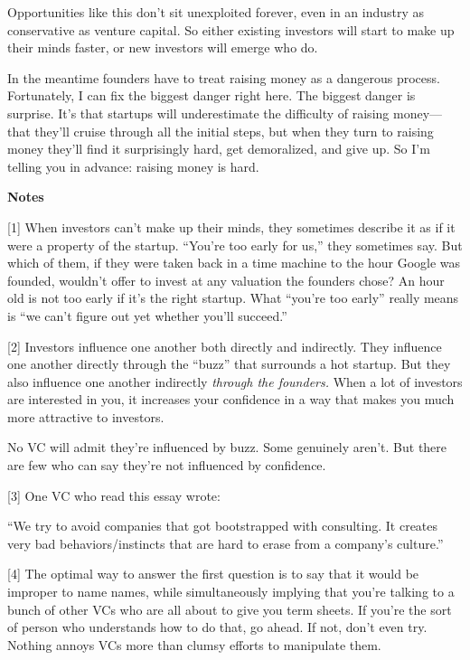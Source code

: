 Opportunities like this don't sit unexploited forever, even in an
industry as conservative as venture capital. So either existing
investors will start to make up their minds faster, or new investors
will emerge who do.

In the meantime founders have to treat raising money as a dangerous
process. Fortunately, I can fix the biggest danger right here. The
biggest danger is surprise. It's that startups will underestimate the
difficulty of raising money---that they'll cruise through all the
initial steps, but when they turn to raising money they'll find it
surprisingly hard, get demoralized, and give up. So I'm telling you in
advance: raising money is hard.

\textbf{Notes}

{[}1{]} When investors can't make up their minds, they sometimes
describe it as if it were a property of the startup. ``You're too early
for us,'' they sometimes say. But which of them, if they were taken back
in a time machine to the hour Google was founded, wouldn't offer to
invest at any valuation the founders chose? An hour old is not too early
if it's the right startup. What ``you're too early'' really means is
``we can't figure out yet whether you'll succeed.''

{[}2{]} Investors influence one another both directly and indirectly.
They influence one another directly through the ``buzz'' that surrounds
a hot startup. But they also influence one another indirectly
\emph{through the founders.} When a lot of investors are interested in
you, it increases your confidence in a way that makes you much more
attractive to investors.

No VC will admit they're influenced by buzz. Some genuinely aren't. But
there are few who can say they're not influenced by confidence.

{[}3{]} One VC who read this essay wrote:

``We try to avoid companies that got bootstrapped with consulting. It
creates very bad behaviors/instincts that are hard to erase from a
company's culture.''

{[}4{]} The optimal way to answer the first question is to say that it
would be improper to name names, while simultaneously implying that
you're talking to a bunch of other VCs who are all about to give you
term sheets. If you're the sort of person who understands how to do
that, go ahead. If not, don't even try. Nothing annoys VCs more than
clumsy efforts to manipulate them.

